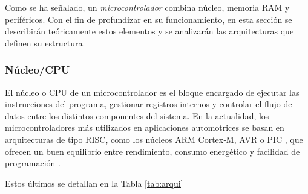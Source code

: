 Como se ha señalado, un \textit{microcontrolador} combina núcleo, memoria RAM y periféricos. Con el fin de profundizar en su funcionamiento, en esta sección se describirán teóricamente estos elementos y se analizarán las arquitecturas que definen su estructura.

\subsubsection{Núcleo/CPU}
El núcleo o CPU de un microcontrolador es el bloque encargado de ejecutar las instrucciones del programa, gestionar registros internos y controlar el flujo de datos entre los distintos componentes del sistema. En la actualidad, los microcontroladores más utilizados en aplicaciones automotrices se basan en arquitecturas de tipo RISC, como los núcleos ARM Cortex‑M, AVR o PIC , que ofrecen un buen equilibrio entre rendimiento, consumo energético y facilidad de programación \citep{MikroE2018}.

Estos últimos se detallan en la Tabla \ref{tab:arqui}

